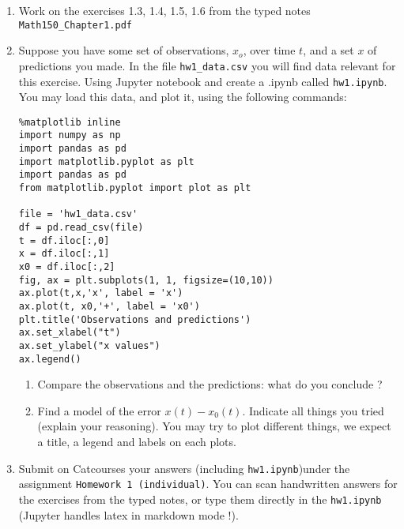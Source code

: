\documentclass[11pt]{article}
\begin{document}
\begin{enumerate}
\item Work on the exercises 1.3, 1.4, 1.5, 1.6  from the typed notes \texttt{Math150\_Chapter1.pdf}
\item Suppose you have some set of observations, $x_o$, over time $t$, and a set $x$ of predictions you made. In the file {\tt hw1\_data.csv} you will find data relevant for this exercise. Using Jupyter notebook and create a .ipynb called {\tt hw1.ipynb}. You may load this data, and plot it, using the following commands:
\begin{verbatim}
%matplotlib inline
import numpy as np
import pandas as pd
import matplotlib.pyplot as plt
import pandas as pd
from matplotlib.pyplot import plot as plt

file = 'hw1_data.csv'
df = pd.read_csv(file)
t = df.iloc[:,0]
x = df.iloc[:,1]
x0 = df.iloc[:,2]
fig, ax = plt.subplots(1, 1, figsize=(10,10))
ax.plot(t,x,'x', label = 'x')
ax.plot(t, x0,'+', label = 'x0')
plt.title('Observations and predictions')
ax.set_xlabel("t")
ax.set_ylabel("x values")
ax.legend()
 \end{verbatim}
 \begin{enumerate}
 \item Compare the observations and the predictions: what do you conclude ? 
 \item Find a model of the error $x(t)-x_0(t)$. Indicate all things you tried (explain your reasoning). You may try to plot different things, we expect a title, a legend and labels on each plots.
  \end{enumerate}
%
\item Submit on Catcourses your answers (including {\tt hw1.ipynb})under the assignment \texttt{Homework 1 (individual)}. You can scan handwritten answers for the exercises from the typed notes, or type them directly in the {\tt hw1.ipynb} (Jupyter handles latex in markdown mode !).
\end{enumerate}
\end{document}
